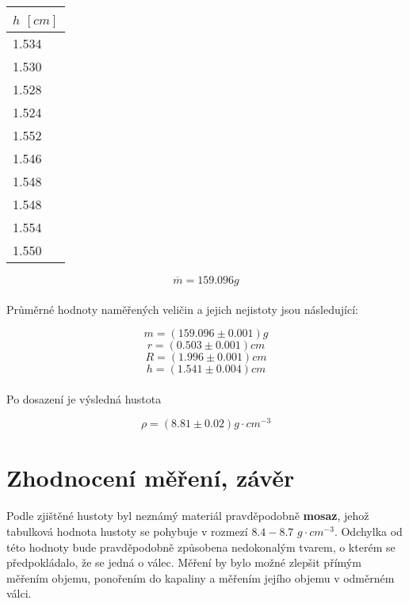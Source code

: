 \documentclass[a4paper,11pt]{article}
\begin{document}
    \begin{center}
        \begin{tabular}{ | l | }
            \hline
            $h$ $[cm]$ \\ \hline
            1.534 \\ \hline
            1.530 \\ \hline
            1.528 \\ \hline
            1.524 \\ \hline
            1.552 \\ \hline
            1.546 \\ \hline
            1.548 \\ \hline
            1.548 \\ \hline
            1.554 \\ \hline
            1.550 \\
            \hline
        \end{tabular}
    \end{center}

    $$\overline{m} = 159.096g$$

    \paragraph{} Průměrné hodnoty naměřených veličin a jejich nejistoty jsou následující:

    $$m = (159.096 \pm 0.001)g$$
    $$r = (0.503 \pm 0.001)cm$$
    $$R = (1.996 \pm 0.001)cm$$
    $$h = (1.541 \pm 0.004)cm$$

    \paragraph{} Po dosazení je výsledná hustota

    $$\rho = \left(8.81 \pm 0.02 \right) g \cdot cm^{-3}$$

\section{Zhodnocení měření, závěr}

    \paragraph{} Podle zjištěné hustoty byl neznámý materiál pravděpodobně \textbf{mosaz}, jehož tabulková
    hodnota hustoty se pohybuje v rozmezí $8.4 - 8.7$ $g \cdot cm^{-3}$. Odchylka od této hodnoty bude 
    pravděpodobně způsobena nedokonalým tvarem, o kterém se předpokládalo, že se jedná o válec. Měření by
    bylo možné zlepšit přímým měřením objemu, ponořením do kapaliny a měřením jejího objemu v odměrném válci.
\end{document}
